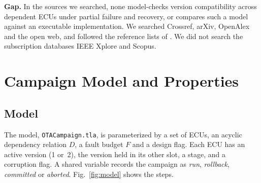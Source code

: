 \documentclass[journal]{IEEEtran}
\begin{document}
\textbf{Gap.} In the sources we searched, none model-checks version compatibility across dependent ECUs under partial failure and recovery, or compares such a model against an executable implementation. We searched Crossref, arXiv, OpenAlex and the open web, and followed the reference lists of \cite{hagen2026,lorch2024}. We did not search the subscription databases IEEE Xplore and Scopus.

\section{Campaign Model and Properties}
\label{sec:model}

\subsection{Model}
The model, \texttt{OTACampaign.tla}, is parameterized by a set of ECUs, an acyclic dependency relation $D$, a fault budget $F$ and a design flag. Each ECU has an active version (1 or~2), the version held in its other slot, a stage, and a corruption flag. A shared variable records the campaign as \emph{run}, \emph{rollback}, \emph{committed} or \emph{aborted}. Fig.~\ref{fig:model} shows the steps.
\end{document}
